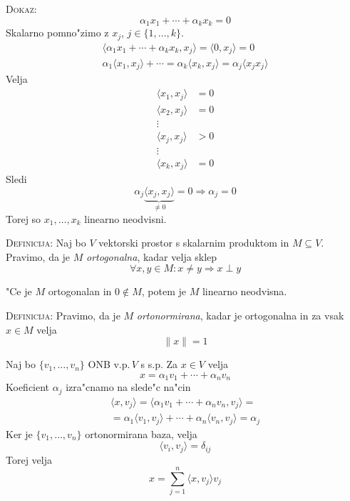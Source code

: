 \textsc{Dokaz:}
\begin{equation*}
\alpha_1 x_1 + \cdots + \alpha_k x_k = 0
\end{equation*}
Skalarno pomno"zimo z $x_j$, $j \in \{ 1, \ldots, k\}$.
\begin{gather*}
\langle \alpha_1 x_1 + \cdots + \alpha_k x_k, x_j \rangle = \langle 0, x_j \rangle = 0 \\
\alpha_1 \langle x_1, x_j \rangle + \cdots = \alpha_k \langle x_k, x_j \rangle = \alpha_j \langle x_j x_j \rangle
\end{gather*}
Velja
\begin{align*}
\langle x_1, x_j \rangle &= 0 \\
\langle x_2, x_j \rangle &= 0 \\
\vdots & \\
\langle x_j, x_j \rangle &> 0 \\
\vdots & \\
\langle x_k, x_j \rangle &= 0
\end{align*}
Sledi
\begin{equation*}
\alpha_j \underbrace{\langle x_j, x_j \rangle}_{\neq 0} = 0 \Rightarrow \alpha_j = 0
\end{equation*}
Torej so $x_1, \ldots, x_k$ linearno neodvisni.

\textsc{Definicija:} Naj bo $V$ vektorski prostor s skalarnim produktom in $M \subseteq V$. Pravimo, da je $M$ \emph{ortogonalna}, kadar velja sklep
\begin{equation*}
\forall x, y \in M: x \neq y \Rightarrow x \perp y
\end{equation*}

"Ce je $M$ ortogonalan in $0 \notin M$, potem je $M$ linearno neodvisna.

\textsc{Definicija:} Pravimo, da je $M$ \emph{ortonormirana}, kadar je ortogonalna in za vsak $x \in M$ velja
\begin{equation*}
\| x \| = 1
\end{equation*}

Naj bo $\{ v_1, \ldots, v_n \}$ ONB v.p.\,$V$ s s.p. Za $x \in V$ velja
\begin{equation*}
x = \alpha_1 v_1 + \cdots + \alpha_n v_n
\end{equation*}
Koeficient $\alpha_j$ izra"cnamo na slede"c na"cin
\begin{multline*}
\langle x, v_j \rangle = \langle \alpha_1 v_1 + \cdots + \alpha_n v_n, v_j \rangle = \\
= \alpha_1 \langle v_1, v_j \rangle + \cdots + \alpha_n \langle v_n, v_j \rangle = \alpha_j
\end{multline*}
Ker je $ \{ v_1, \ldots, v_n \}$ ortonormirana baza, velja
\begin{equation*}
\langle v_i, v_j \rangle = \delta_{ij}
\end{equation*}
Torej velja
\begin{equation*}
x = \sum_{j = 1}^n \langle x, v_j \rangle v_j
\end{equation*}

